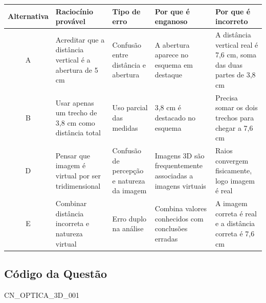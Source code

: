 \documentclass{article}
\begin{document}
\begin{tabular}{|c|p{4cm}|p{4cm}|p{5cm}|p{5cm}|}
  \hline
  \textbf{Alternativa} & \textbf{Raciocínio provável} & \textbf{Tipo de erro} & \textbf{Por que é enganoso} & \textbf{Por que é incorreto} \\
  \hline
  A & Acreditar que a distância vertical é a abertura de 5 cm & Confusão entre distância e abertura & A abertura aparece no esquema em destaque & A distância vertical real é 7,6 cm, soma das duas partes de 3,8 cm \\
  \hline
  B & Usar apenas um trecho de 3,8 cm como distância total & Uso parcial das medidas & 3,8 cm é destacado no esquema & Precisa somar os dois trechos para chegar a 7,6 cm \\
  \hline
  D & Pensar que imagem é virtual por ser tridimensional & Confusão de percepção e natureza da imagem & Imagens 3D são frequentemente associadas a imagens virtuais & Raios convergem fisicamente, logo imagem é real \\
  \hline
  E & Combinar distância incorreta e natureza virtual & Erro duplo na análise & Combina valores conhecidos com conclusões erradas & A imagem correta é real e a distância correta é 7,6 cm \\
  \hline
\end{tabular}

\subsection*{Código da Questão}

CN_OPTICA_3D_001
\end{document}
